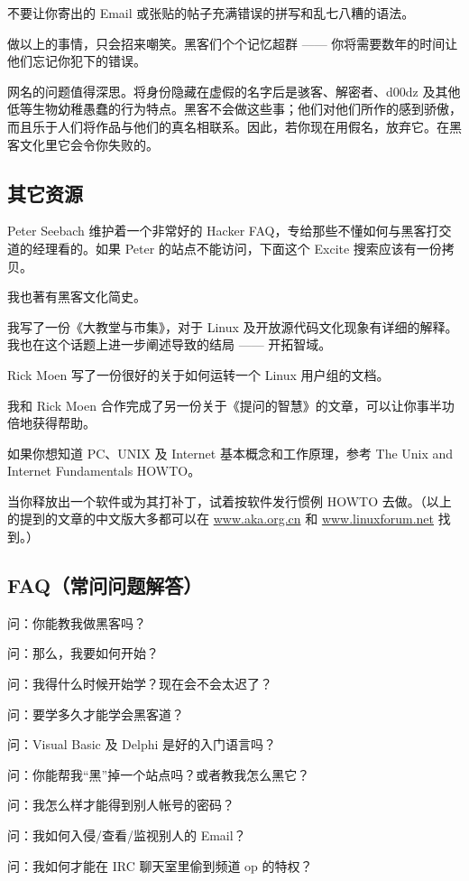 不要让你寄出的 Email 或张贴的帖子充满错误的拼写和乱七八糟的语法。

做以上的事情，只会招来嘲笑。黑客们个个记忆超群 —— 你将需要数年的时间让他们忘记你犯下的错误。

网名的问题值得深思。将身份隐藏在虚假的名字后是骇客、解密者、d00dz 及其他低等生物幼稚愚蠢的行为特点。黑客不会做这些事；他们对他们所作的感到骄傲，而且乐于人们将作品与他们的真名相联系。因此，若你现在用假名，放弃它。在黑客文化里它会令你失败的。


\subsection{其它资源}
Peter Seebach 维护着一个非常好的 Hacker FAQ，专给那些不懂如何与黑客打交道的经理看的。如果 Peter 的站点不能访问，下面这个 Excite 搜索应该有一份拷贝。

我也著有黑客文化简史。

我写了一份《大教堂与市集》，对于 Linux 及开放源代码文化现象有详细的解释。我也在这个话题上进一步阐述导致的结局 —— 开拓智域。

Rick Moen 写了一份很好的关于如何运转一个 Linux 用户组的文档。

我和 Rick Moen 合作完成了另一份关于《提问的智慧》的文章，可以让你事半功倍地获得帮助。

如果你想知道 PC、UNIX 及 Internet 基本概念和工作原理，参考 The Unix and Internet Fundamentals HOWTO。

当你释放出一个软件或为其打补丁，试着按软件发行惯例 HOWTO 去做。（以上的提到的文章的中文版大多都可以在 \url{www.aka.org.cn} 和 \url{www.linuxforum.net} 找到。）


\subsection{FAQ（常问问题解答）}
问：你能教我做黑客吗？

问：那么，我要如何开始？

问：我得什么时候开始学？现在会不会太迟了？

问：要学多久才能学会黑客道？

问：Visual Basic 及 Delphi 是好的入门语言吗？

问：你能帮我“黑”掉一个站点吗？或者教我怎么黑它？

问：我怎么样才能得到别人帐号的密码？

问：我如何入侵/查看/监视别人的 Email？

问：我如何才能在 IRC 聊天室里偷到频道 op 的特权？

